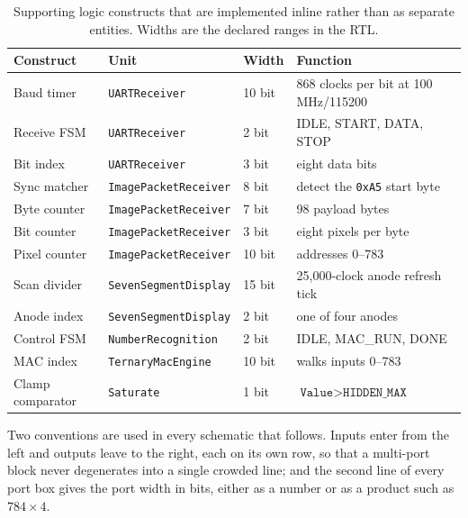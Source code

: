 \documentclass[11pt,a4paper]{article}
\begin{document}
\begin{table}[H]
\centering
\small
\caption{Supporting logic constructs that are implemented inline rather than as
  separate entities. Widths are the declared ranges in the RTL.}
\label{tab:support}
\begin{tabularx}{\linewidth}{@{}l l l Y@{}}
\toprule
\textbf{Construct} & \textbf{Unit} & \textbf{Width} & \textbf{Function} \\
\midrule
Baud timer        & \texttt{UARTReceiver}       & 10 bit & 868 clocks per bit at 100\,MHz/115200 \\
Receive FSM       & \texttt{UARTReceiver}       & 2 bit  & IDLE, START, DATA, STOP \\
Bit index         & \texttt{UARTReceiver}       & 3 bit  & eight data bits \\
Sync matcher      & \texttt{ImagePacketReceiver}& 8 bit  & detect the \texttt{0xA5} start byte \\
Byte counter      & \texttt{ImagePacketReceiver}& 7 bit  & 98 payload bytes \\
Bit counter       & \texttt{ImagePacketReceiver}& 3 bit  & eight pixels per byte \\
Pixel counter     & \texttt{ImagePacketReceiver}& 10 bit & addresses 0--783 \\
Scan divider      & \texttt{SevenSegmentDisplay} & 15 bit & 25{,}000-clock anode refresh tick \\
Anode index       & \texttt{SevenSegmentDisplay} & 2 bit  & one of four anodes \\
Control FSM       & \texttt{NumberRecognition}  & 2 bit  & IDLE, MAC\_RUN, DONE \\
MAC index         & \texttt{TernaryMacEngine}   & 10 bit & walks inputs 0--783 \\
Clamp comparator  & \texttt{Saturate}           & 1 bit  & $\texttt{Value} > \texttt{HIDDEN\_MAX}$ \\
\bottomrule
\end{tabularx}
\end{table}

Two conventions are used in every schematic that follows. Inputs enter from the
left and outputs leave to the right, each on its own row, so that a multi-port
block never degenerates into a single crowded line; and the second line of every
port box gives the port width in bits, either as a number or as a product such
as $784\times4$.

\end{document}
